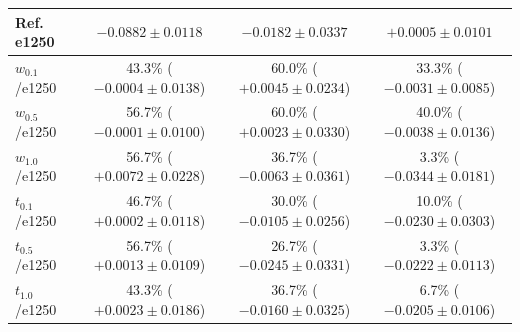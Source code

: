 \begin{table}[t]
\begin{tabular}{p{1.5cm}ccc}
\midrule
Ref. e1250 & $-0.0882 \pm 0.0118$ & $-0.0182 \pm 0.0337$ & $+0.0005 \pm 0.0101$ \\ \hline
$w_{0.1}$/e1250 & \makecell{43.3\% \\ ($-0.0004 \pm 0.0138$)} & \makecell{60.0\% \\ ($+0.0045 \pm 0.0234$)} & \makecell{33.3\% \\ ($-0.0031 \pm 0.0085$)} \\ \hdashline
$w_{0.5}$/e1250 & \makecell{56.7\% \\ ($-0.0001 \pm 0.0100$)} & \makecell{60.0\% \\ ($+0.0023 \pm 0.0330$)} & \makecell{40.0\% \\ ($-0.0038 \pm 0.0136$)} \\ \hdashline
$w_{1.0}$/e1250 & \makecell{56.7\% \\ ($+0.0072 \pm 0.0228$)} & \makecell{36.7\% \\ ($-0.0063 \pm 0.0361$)} & \makecell{3.3\% \\ ($-0.0344 \pm 0.0181$)} \\ \hdashline
$t_{0.1}$/e1250 & \makecell{46.7\% \\ ($+0.0002 \pm 0.0118$)} & \makecell{30.0\% \\ ($-0.0105 \pm 0.0256$)} & \makecell{10.0\% \\ ($-0.0230 \pm 0.0303$)} \\ \hdashline
$t_{0.5}$/e1250 & \makecell{56.7\% \\ ($+0.0013 \pm 0.0109$)} & \makecell{26.7\% \\ ($-0.0245 \pm 0.0331$)} & \makecell{3.3\% \\ ($-0.0222 \pm 0.0113$)} \\ \hdashline
$t_{1.0}$/e1250 & \makecell{43.3\% \\ ($+0.0023 \pm 0.0186$)} & \makecell{36.7\% \\ ($-0.0160 \pm 0.0325$)} & \makecell{6.7\% \\ ($-0.0205 \pm 0.0106$)} \\
\bottomrule
\end{tabular}
\end{table}

